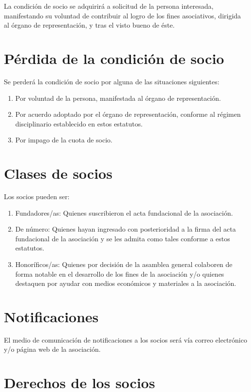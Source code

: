 \documentclass[a4paper, 12pt, oneside]{book}
\begin{document}
La condición de socio se adquirirá a solicitud de la persona interesada, manifestando su voluntad de contribuir al logro de los fines asociativos, dirigida al órgano de representación, y tras el visto bueno de éste.

\section{Pérdida de la condición de socio}

Se perderá la condición de socio por alguna de las situaciones siguientes:

\begin{enumerate}
    \item Por voluntad de la persona, manifestada al órgano de representación.
    \item Por acuerdo adoptado por el órgano de representación, conforme al régimen disciplinario establecido en estos estatutos.
    \item Por impago de la cuota de socio.
\end{enumerate}

\section{Clases de socios}

Los socios pueden ser:

\begin{enumerate}
    \item Fundadores/as: Quienes suscribieron el acta fundacional de la asociación.
    \item De número: Quienes hayan ingresado con posterioridad a la firma del acta fundacional de la asociación y se les admita como tales conforme a estos estatutos.
    \item Honoríficos/as: Quienes por decisión de la asamblea general colaboren de forma notable en el desarrollo de los fines de la asociación y/o quienes destaquen por ayudar con medios económicos y materiales a la asociación.
\end{enumerate}

\section{Notificaciones}

El medio de comunicación de notificaciones a los socios será vía correo electrónico y/o página web de la asociación.

\section{Derechos de los socios}
\end{document}
